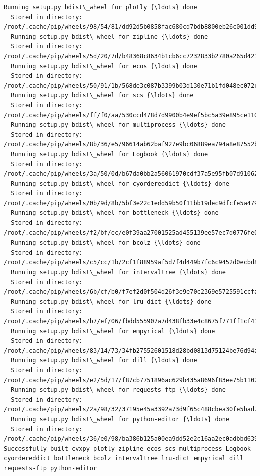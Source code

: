 \documentclass[11pt]{article}
\begin{document}
\begin{Verbatim}[commandchars=\\\{\}]
  Running setup.py bdist\_wheel for plotly {\ldots} done
  Stored in directory: /root/.cache/pip/wheels/98/54/81/dd92d5b0858fac680cd7bdb8800eb26c001dd9f5dc8b1bc0ba
  Running setup.py bdist\_wheel for zipline {\ldots} done
  Stored in directory: /root/.cache/pip/wheels/5d/20/7d/b48368c8634b1cb6cc7232833b2780a265d4217c0ad2e3d24c
  Running setup.py bdist\_wheel for ecos {\ldots} done
  Stored in directory: /root/.cache/pip/wheels/50/91/1b/568de3c087b3399b03d130e71b1fd048ec072c45f72b6b6e9a
  Running setup.py bdist\_wheel for scs {\ldots} done
  Stored in directory: /root/.cache/pip/wheels/ff/f0/aa/530ccd478d7d9900b4e9ef5bc5a39e895ce110bed3d3ac653e
  Running setup.py bdist\_wheel for multiprocess {\ldots} done
  Stored in directory: /root/.cache/pip/wheels/8b/36/e5/96614ab62baf927e9bc06889ea794a8e87552b84bb6bf65e3e
  Running setup.py bdist\_wheel for Logbook {\ldots} done
  Stored in directory: /root/.cache/pip/wheels/3a/50/0d/b67da0bb2a56061970cdf37a5e95fb07d9106200f33044616e
  Running setup.py bdist\_wheel for cyordereddict {\ldots} done
  Stored in directory: /root/.cache/pip/wheels/0b/9d/8b/5bf3e22c1edd59b50f11bb19dec9dfcfe5a479fc7ace02b61f
  Running setup.py bdist\_wheel for bottleneck {\ldots} done
  Stored in directory: /root/.cache/pip/wheels/f2/bf/ec/e0f39aa27001525ad455139ee57ec7d0776fe074dfd78c97e4
  Running setup.py bdist\_wheel for bcolz {\ldots} done
  Stored in directory: /root/.cache/pip/wheels/c5/cc/1b/2cf1f88959af5d7f4d449b7fc6c9452d0ecbd86fd61a9ee376
  Running setup.py bdist\_wheel for intervaltree {\ldots} done
  Stored in directory: /root/.cache/pip/wheels/6b/cf/b0/f7ef2d0f504d26f3e9e70c2369e5725591ccfaf67d528fcbc5
  Running setup.py bdist\_wheel for lru-dict {\ldots} done
  Stored in directory: /root/.cache/pip/wheels/b7/ef/06/fbdd555907a7d438fb33e4c8675f771ff1cf41917284c51ebf
  Running setup.py bdist\_wheel for empyrical {\ldots} done
  Stored in directory: /root/.cache/pip/wheels/83/14/73/34fb27552601518d28bd0813d75124be76d94ab29152c69112
  Running setup.py bdist\_wheel for dill {\ldots} done
  Stored in directory: /root/.cache/pip/wheels/e2/5d/17/f87cb7751896ac629b435a8696f83ee75b11029f5d6f6bda72
  Running setup.py bdist\_wheel for requests-ftp {\ldots} done
  Stored in directory: /root/.cache/pip/wheels/2a/98/32/37195e45a3392a73d9f65c488cbea30fe5bad76aaef4d6b020
  Running setup.py bdist\_wheel for python-editor {\ldots} done
  Stored in directory: /root/.cache/pip/wheels/36/e0/98/ba386b125a00ea9dd52e2c16aa2ec0adbbd639b84bfe2e001d
Successfully built cvxpy plotly zipline ecos scs multiprocess Logbook cyordereddict bottleneck bcolz intervaltree lru-dict empyrical dill requests-ftp python-editor

\end{Verbatim}
\end{document}
